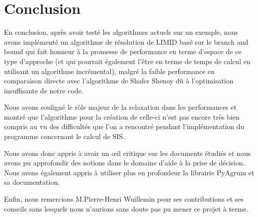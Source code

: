 \documentclass[12pt]{article}
\begin{document}
\section{Conclusion}
En conclusion, après avoir testé les algorithmes actuels sur un exemple, nous avons implémenté un algorithme de résolution de LIMID basé sur le branch and bound qui fait honneur à la promesse de performance en terme d'espace de ce type d'approche (et qui pourrait également l'être en terme de temps de calcul en utilisant un algorithme incrémental), malgré la faible performance en comparaison directe avec l'algorithme de Shafer Shenoy dû à l'optimisation insuffisante de notre code. 

Nous avons souligné le rôle majeur de la relaxation dans les performances et montré que l'algorithme pour la création de celle-ci n'est pas encore très bien compris au vu des difficultés que l'on a rencontré pendant l'implémentation du programme concernant le calcul de SIS.

Nous avons donc appris à avoir un œil critique sur les documents étudiés et nous avons pu approfondir des notions dans le domaine d'aide à la prise de décision. Nous avons également appris à utiliser plus en profondeur la librairie PyAgrum et sa documentation.

Enfin, nous remercions M.Pierre-Henri Wuillemin pour ses contributions et ses conseils sans lesquels nous n'aurions sans doute pas pu mener ce projet à terme.
 



\newpage
\end{document}
